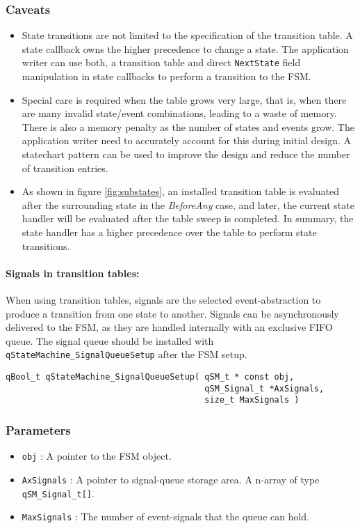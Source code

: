 \subsubsection*{Caveats}
\begin{itemize}
    \item State transitions are not limited to the specification of the transition table. A state callback owns the higher precedence to change a state. The application writer can use both, a transition table and direct \lstinline{NextState} field manipulation in state callbacks to perform a transition to the FSM.
    \item Special care is required when the table grows very large, that is, when there are many invalid state/event combinations, leading to a waste of memory. There is also a memory penalty as the number of states and events grow. The application writer  need to accurately account for this during initial design. A statechart pattern can be used to improve the design and reduce the number of transition entries. 
    \item As shown in figure \ref{fig:substates}, an installed transition table is evaluated after the surrounding state in the \textit{BeforeAny} case, and later, the current state handler will be evaluated after the table sweep is completed. In summary, the state handler has a higher precedence over the table to perform state transitions.
\end{itemize}

\paragraph{Signals in transition tables:}
When using transition tables, signals are the selected event-abstraction to produce a transition from one state to another. Signals can be asynchronously delivered to the FSM, as they are handled internally with an exclusive FIFO queue. 
The signal queue should be installed with \lstinline{qStateMachine_SignalQueueSetup} after the FSM setup.
\medskip

\begin{lstlisting}[style=CStyle]
qBool_t qStateMachine_SignalQueueSetup( qSM_t * const obj, 
                                        qSM_Signal_t *AxSignals, 
                                        size_t MaxSignals )
\end{lstlisting} 

\subsubsection*{Parameters}
\begin{itemize}
    \item \lstinline{obj} : A pointer to the FSM object. 
    \item \lstinline{AxSignals} : A pointer to signal-queue storage area. A n-array of type \lstinline{qSM_Signal_t[]}.
    \item \lstinline{MaxSignals} : The number of event-signals that the queue can hold.
\end{itemize}

